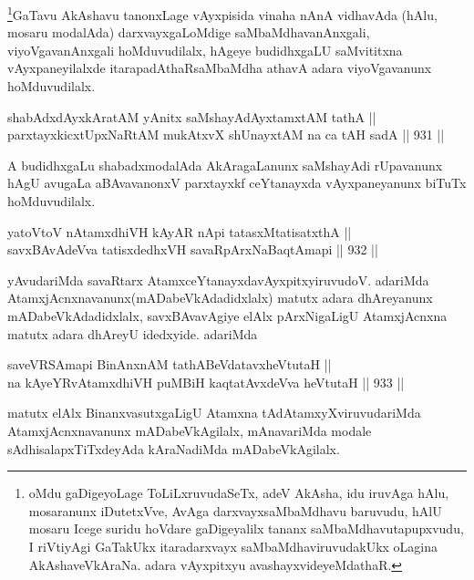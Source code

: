 \begin{artha}
\footnote{oMdu gaDigeyoLage ToLiLxruvudaSeTx, adeV AkAsha, idu iruvAga hAlu, mosaranunx iDutetxVve, AvAga darxvayxsaMbaMdhavu baruvudu, hAlU mosaru Icege suridu hoVdare gaDigeyalilx tananx saMbaMdhavutapupxvudu, I riVtiyAgi GaTakUkx itaradarxvayx saMbaMdhaviruvudakUkx oLagina AkAshaveVkAraNa. adara vAyxpitxyu avashayxvideyeMdathaR.}GaTavu AkAshavu tanonxLage vAyxpisida vinaha nAnA vidhavAda (hAlu, mosaru modalAda) darxvayxgaLoMdige saMbaMdhavanAnxgali, viyoVgavanAnxgali hoMduvudilalx, hAgeye budidhxgaLU saMvititxna vAyxpaneyilalxde itarapadAthaRsaMbaMdha athavA adara viyoVgavanunx hoMduvudilalx.
\end{artha}


\begin{shl}
shabAdxdAyxkAratAM yAnitx saMshayAdAyxtamxtAM tathA ||  \\
parxtayxkicxtUpxNaRtAM mukAtxvX shUnayxtAM na ca tAH sadA \hfill || 931 ||  
\end{shl}

\begin{artha}
A budidhxgaLu shabadxmodalAda AkAragaLanunx saMshayAdi rUpavanunx hAgU avugaLa aBAvavanonxV parxtayxkf ceYtanayxda vAyxpaneyanunx biTuTx hoMduvudilalx.
\end{artha}


\begin{shl}
yatoV\s toV nA\s \s tamxdhiVH kAyAR nApi tatasxMtatisatxthA || \\
savxBAvAdeVva tatisxdedhxVH savaRpArxNaBaqtAmapi \hfill || 932 ||  
\end{shl}

\begin{artha}
yAvudariMda savaRtarx AtamxceYtanayxdavAyxpitxyiruvudoV. adariMda AtamxjAcnxnavanunx(mADabeVkAdadidxlalx) matutx adara dhAreyanunx mADabeVkAdadidxlalx, savxBAvavAgiye elAlx pArxNigaLigU AtamxjAcnxna matutx adara dhAreyU idedxyide. adariMda
\end{artha}

\begin{shl}
saveVRSAmapi BinAnxnAM tathA\s BeVdatavxheVtutaH || \\
na kAyeYRvA\s \s tamxdhiVH puMBiH kaqtatAvxdeVva heVtutaH \hfill || 933 ||  
\end{shl}

\begin{artha}
matutx elAlx BinanxvasutxgaLigU Atamxna tAdAtamxyXviruvudariMda AtamxjAcnxnavanunx mADabeVkAgilalx, mAnavariMda modale sAdhisalapxTiTxdeyAda kAraNadiMda mADabeVkAgilalx.
\end{artha}

